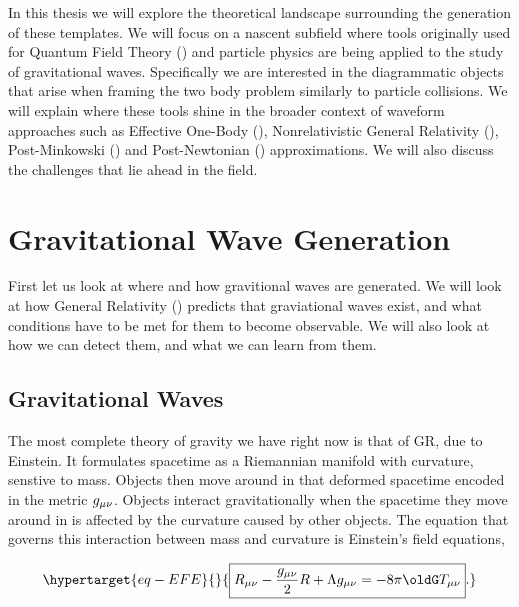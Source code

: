 \documentclass[
  letterpaper,
  DIV=11,
  numbers=noendperiod,
  oneside]{scrreprt}
\begin{document}
In this thesis we will explore the theoretical landscape surrounding the
generation of these templates. We will focus on a nascent subfield where
tools originally used for Quantum Field Theory () and particle physics
are being applied to the study of gravitational waves. Specifically we
are interested in the diagrammatic objects that arise when framing the
two body problem similarly to particle collisions. We will explain where
these tools shine in the broader context of waveform approaches such as
Effective One-Body (), Nonrelativistic General Relativity (),
Post-Minkowski () and Post-Newtonian () approximations. We will also
discuss the challenges that lie ahead in the field.


\hypertarget{gravitational-wave-generation}{%
\chapter{Gravitational Wave
Generation}\label{gravitational-wave-generation}}

First let us look at where and how gravitional waves are generated. We
will look at how General Relativity () predicts that graviational waves
exist, and what conditions have to be met for them to become observable.
We will also look at how we can detect them, and what we can learn from
them.

\hypertarget{gravitational-waves}{%
\section{Gravitational Waves}\label{gravitational-waves}}

The most complete theory of gravity we have right now is that of {GR},
due to Einstein. It formulates spacetime as a Riemannian manifold with
curvature, senstive to mass. Objects then move around in that deformed
spacetime encoded in the metric
\(\texttip{\texttip{g}{metric tensor}_{{\mu\nu}}}{covariant metric tensor component}\).
Objects interact gravitationally when the spacetime they move around in
is affected by the curvature caused by other objects. The equation that
governs this interaction between mass and curvature is Einstein's field
equations,

\begin{equation}\protect\hypertarget{eq-EFE}{}{
\boxed{\texttip{\texttip{R}{Ricci tensor}_{{\mu\nu}}}{covariant Ricci tensor component}-\frac{\texttip{\texttip{g}{metric tensor}_{{\mu\nu}}}{covariant metric tensor component}}{2} \texttip{R}{Ricci scalar}+\texttip{\Lambda}{cosmological constant}\texttip{\texttip{g}{metric tensor}_{{\mu\nu}}}{covariant metric tensor component}=-8 \pi \oldG\texttip{\texttip{T}{Stress-Energy tensor, or energy-momentum tensor}_{{\mu\nu}}}{covariant Stress-Energy tensor component}} .
}\label{eq-EFE}\end{equation}
\end{document}
